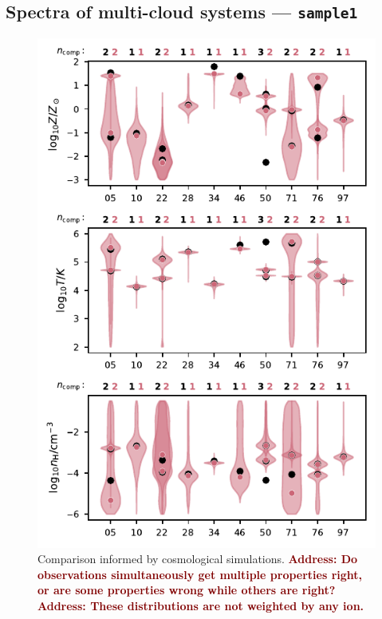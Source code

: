 \documentclass[fleqn,usenatbib]{mnras}
\newcommand{\todo}[1]{\textcolor{Maroon}{\textbf{Address: #1}}}
\begin{document}
\subsection{Spectra of multi-cloud systems --- \texttt{sample1}}
\label{s: results -- sample1}

\begin{figure}
    \centering
    \includegraphics[width=\columnwidth]{figures/sample1/comparison.pdf}
    \caption{
    Comparison informed by cosmological simulations.
    \todo{Do observations simultaneously get multiple properties right, or are some properties wrong while others are right?}
    \todo{These distributions are not weighted by any ion.}
    }
    \label{f: informed}
\end{figure}
\end{document}
